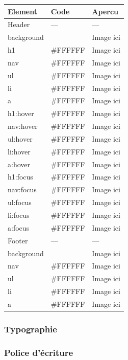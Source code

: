 \documentclass[letter, 10pt]{report}
\begin{document}
\begin{center}
	\begin{tabular}{|l|l|l|}
	\hline
	Element & Code & Apercu \\ \hline
	Header & --- & --- \\ \hline
	background & #000000 & Image ici \\ \hline
	h1 & #FFFFFF & Image ici \\ \hline
	nav & #FFFFFF & Image ici \\ \hline
	ul & #FFFFFF & Image ici \\ \hline
	li & #FFFFFF & Image ici \\ \hline
	a & #FFFFFF & Image ici \\ \hline
	h1:hover & #FFFFFF & Image ici \\ \hline
	nav:hover & #FFFFFF & Image ici \\ \hline
	ul:hover & #FFFFFF & Image ici \\ \hline
	li:hover & #FFFFFF & Image ici \\ \hline
	a:hover & #FFFFFF & Image ici \\ \hline
	h1:focus & #FFFFFF & Image ici \\ \hline
	nav:focus & #FFFFFF & Image ici \\ \hline
	ul:focus & #FFFFFF & Image ici \\ \hline
	li:focus & #FFFFFF & Image ici \\ \hline
	a:focus & #FFFFFF & Image ici \\ \hline
	Footer & --- & --- \\ \hline
	background & #000000 & Image ici \\ \hline
	nav & #FFFFFF & Image ici \\ \hline
	ul & #FFFFFF & Image ici \\ \hline
	li & #FFFFFF & Image ici \\ \hline
	a & #FFFFFF & Image ici \\ \hline
	\hline
	\end{tabular}
\end{center}

\subsubsection{Typographie}

\subsubsection{Police d’écriture}
\end{document}
